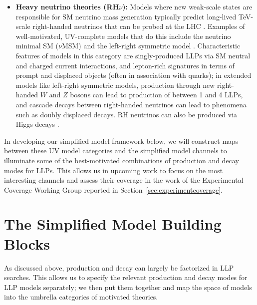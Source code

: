 \begin{itemize}
\item {\bf Heavy neutrino theories (RH$\nu$):}  Models where  new weak-scale states are responsible for SM neutrino mass generation \cite{Minkowski:1977sc,Yanagida:1979as,Mohapatra:1979ia,Glashow:1979nm,Mohapatra:1986bd} typically predict long-lived TeV-scale right-handed neutrinos that can be probed at the LHC \cite{Keung:1983uu,Ferrari:2000sp,Basso:2008iv,Perez:2009mu,Nemevsek:2011hz,Helo:2013esa,Izaguirre:2015pga,Maiezza:2015lza,Nemevsek:2016enw}. Examples of well-motivated, UV-complete models that do this include the neutrino minimal SM ($\nu$MSM) \cite{Asaka:2005an,Asaka:2005pn} and the left-right symmetric model \cite{Pati:1974yy,Mohapatra:1974gc,Senjanovic:1975rk,Senjanovic:1978ev}.  Characteristic features of models in this category are singly-produced LLPs via SM neutral and charged current interactions, and lepton-rich signatures in terms of prompt and displaced objects (often in association with quarks); in extended models like left-right symmetric models, production through new right-handed $W$ and $Z$ bosons can lead to production of between 1 and 4 LLPs, and cascade decays between right-handed neutrinos can lead to phenomena such as doubly displaced decays. RH neutrinos can also be produced via Higgs decays \cite{Graesser:2007yj, Graesser:2007pc,Maiezza:2015lza,Accomando:2016rpc,Das:2017rsu,Caputo:2017pit}.

\end{itemize}

%
In developing our simplified model framework below, we will construct maps between these UV model categories and the simplified model channels to illuminate some of the best-motivated combinations of production and decay modes for LLPs. This  allows us in upcoming work to focus on the most interesting channels and assess their coverage in the work of the Experimental Coverage Working Group reported in Section~\ref{sec:experimentcoverage}.



\section{The Simplified Model Building Blocks}\label{sec:building_blocks}


As discussed above, production and decay can largely be factorized in LLP searches. This allows us to specify the relevant production and decay modes for LLP models separately; we then put them together and map the space of models into the umbrella categories of motivated theories.

